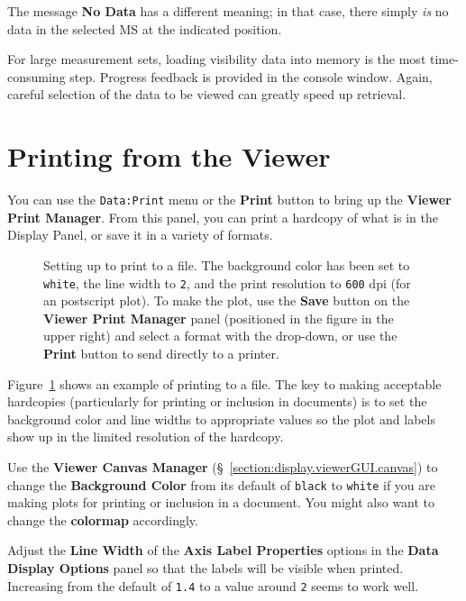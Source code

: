 The message {\bf No Data} has a different meaning; in that
case, there simply {\it is} no data in the selected MS at the
indicated position.

For large measurement sets, loading visibility data into memory is the
most time-consuming step.  Progress feedback is provided in the
console window.  Again, careful selection of the data to be viewed can
greatly speed up retrieval.

\section{Printing from the Viewer}
\label{section:display.print}

You can use the {\tt Data:Print} menu or the {\bf Print} button to
bring up the {\bf Viewer Print Manager}.  From this panel, you can
print a hardcopy of what is in the Display Panel, or save it in a 
variety of formats.

\begin{figure}[h!]
\begin{center}
\caption{\label{fig:viewer_print} Setting up to print to a file.
The background color has been set to {\tt white}, the line width
to {\tt 2}, and the print resolution to {\tt 600} dpi (for an
postscript plot).  To make the plot, use the {\bf Save} button on
the {\bf Viewer Print Manager} panel (positioned in the figure in
the upper right) and select a format with the drop-down, or 
use the {\bf Print} button to send directly to a printer.
} 
\hrulefill
\end{center}
\end{figure}

Figure~\ref{fig:viewer_print} shows an example of printing to a file.
The key to making acceptable hardcopies (particularly for printing
or inclusion in documents) is to set the background color and line
widths to appropriate values so the plot and labels show up in the
limited resolution of the hardcopy.

Use the {\bf Viewer Canvas Manager} 
(\S~\ref{section:display.viewerGUI.canvas}) to change the 
{\bf Background Color} from its default of {\tt black} to
{\tt white} if you are making plots for printing or inclusion in
a document.  You might also want to change the {\bf colormap}
accordingly.

Adjust the {\bf Line Width} of the {\bf Axis Label Properties}
options in the {\bf Data Display Options} panel so that the
labels will be visible when printed.  Increasing from the default
of {\tt 1.4} to a value around {\tt 2} seems to work well.

